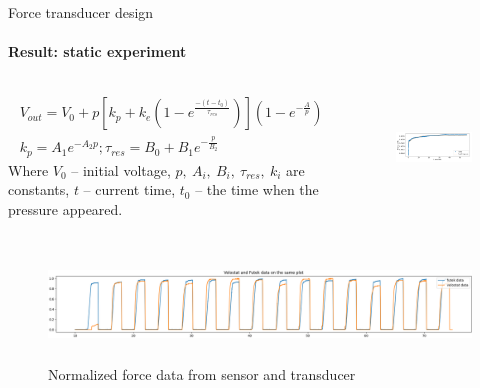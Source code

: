 \documentclass[aspectratio=169]{beamer}
\begin{document}
\begin{frame}[t]{Force transducer design}
    \framesubtitle{Result: static experiment}
    \vspace{-0.5cm}
    \begin{columns}[T,onlytextwidth]
        \begin{column}{0.52\textwidth}
            \begin{eqnarray*}
                V_{out} = V_0 + p[k_p + k_e(1-e^\frac{-(t-t_0)}{\tau_{res}})](1-e^{-\frac{A}{p}}) \\
                k_p = A_1e^{-A_2p}; \tau_{res} = B_0 + B_1e^{-\frac{p}{B_2}}
            \end{eqnarray*}
            Where $V_0$ -- initial voltage, $p,\ A_i,\ B_i,\ \tau_{res},\ k_i$ are constants, $t$ -- current time, $t_0$ -- the time when the pressure appeared.
        \end{column}
        \begin{column}{0.45\textwidth}
            \vspace{-15pt}
            \begin{figure}[H]
                \centering\includegraphics[height=2.8cm,width=1\textwidth,keepaspectratio]{least_square_model.png}
                \label{fig:least_square_model.png}
            \end{figure}
        \end{column}
    \end{columns}
    \vspace{-11pt}
    \begin{figure}[H]
        \centering\includegraphics[height=3cm,width=1\textwidth,keepaspectratio]{pikes.png}
        \caption*{ Normalized force data from sensor and transducer}
        \label{fig:pikes.png}
    \end{figure}
\end{frame}
\end{document}
